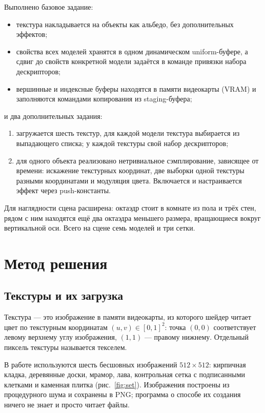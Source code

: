 \documentclass[14pt,a4paper]{extarticle}
\begin{document}
Выполнено базовое задание:

\begin{itemize}[nosep, leftmargin=*]
	\item текстура накладывается на объекты как альбедо, без дополнительных
	эффектов;
	\item свойства всех моделей хранятся в одном динамическом uniform-буфере,
	а сдвиг до свойств конкретной модели задаётся в команде привязки набора
	дескрипторов;
	\item вершинные и индексные буферы находятся в памяти видеокарты (VRAM) и
	заполняются командами копирования из staging-буфера;
\end{itemize}

\noindent и два дополнительных задания:

\begin{enumerate}[nosep, leftmargin=*]
	\item загружается шесть текстур, для каждой модели текстура выбирается из
	выпадающего списка; у каждой текстуры свой набор дескрипторов;
	\item для одного объекта реализовано нетривиальное сэмплирование,
	зависящее от времени: искажение текстурных координат, две выборки одной
	текстуры разными координатами и модуляция цвета. Включается и
	настраивается эффект через push-константы.
\end{enumerate}

Для наглядности сцена расширена: октаэдр стоит в комнате из пола и трёх стен,
рядом с ним находятся ещё два октаэдра меньшего размера, вращающиеся вокруг
вертикальной оси. Всего на сцене семь моделей и три сетки.

\section{Метод решения}

\subsection{Текстуры и их загрузка}

Текстура — это изображение в памяти видеокарты, из которого шейдер читает
цвет по текстурным координатам $(u, v) \in [0, 1]^2$: точка $(0, 0)$
соответствует левому верхнему углу изображения, $(1, 1)$ — правому нижнему.
Отдельный пиксель текстуры называется текселем.

В работе используются шесть бесшовных изображений $512 \times 512$:
кирпичная кладка, деревянные доски, мрамор, лава, контрольная сетка с
подписанными клетками и каменная плитка (рис.~\ref{fig:set}). Изображения
построены из процедурного шума и сохранены в PNG; программа о способе их
создания ничего не знает и просто читает файлы.
\end{document}

